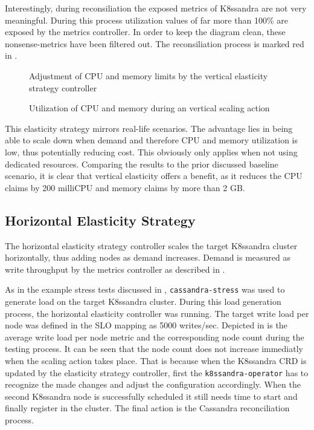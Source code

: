 Interestingly, during reconsiliation the exposed metrics of K8ssandra are not very meaningful. During this process utilization values of far more than 100\% are exposed by the metrics controller. In order to keep the diagram clean, these nonsense-metrics have been filtered out. The reconsiliation process is marked red in .

\begin{figure}[H]
    \centering
    
    \caption{Adjustment of CPU and memory limits by the vertical elasticity strategy controller}
    \label{fig:simple-limits-vertical}
\end{figure}

\begin{figure}[H]
    \centering
    
    \caption{Utilization of CPU and memory during an vertical scaling action}
    \label{fig:utilization-vertical}
\end{figure}

This elasticity strategy mirrors real-life scenarios. The advantage lies in being able to scale down when demand and therefore CPU and memory utilization is low, thus potentially reducing cost. This obviously only applies when not using dedicated resources. Comparing the results to the prior discussed baseline scenario, it is clear that vertical elasticity offers a benefit, as it reduces the CPU claims by 200 milliCPU and memory claims by more than 2 GB.

\subsection{Horizontal Elasticity Strategy}
\label{sec:evaluation-horizontal-elasticity}

The horizontal elasticity strategy controller scales the target K8ssandra cluster horizontally, thus adding nodes as demand increases. Demand is measured as write throughput by the metrics controller as described in .

As in the example stress tests discussed in , \texttt{cassandra-stress} was used to generate load on the target K8ssandra cluster. During this load generation process, the horizontal elasticity controller was running. The target write load per node was defined in the SLO mapping as 5000 writes/sec. Depicted in  is the average write load per node metric and the corresponding node count during the testing process. It can be seen that the node count does not increase immediatly when the scaling action takes place. That is because when the K8ssandra CRD is updated by the elasticity strategy controller, first the \texttt{k8ssandra-operator} has to recognize the made changes and adjust the configuration accordingly. When the second K8ssandra node is successfully scheduled it still needs time to start and finally register in the cluster. The final action is the Cassandra reconciliation process.

